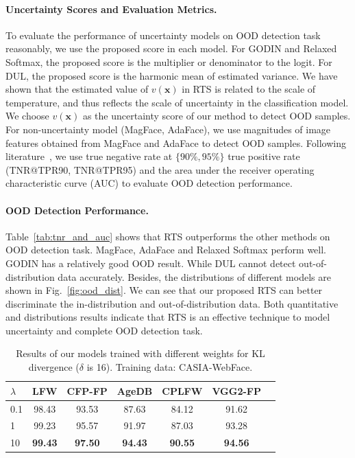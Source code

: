 \documentclass[letterpaper]{article} %
\begin{document}
\paragraph{Uncertainty Scores and Evaluation Metrics.}
To evaluate the performance of uncertainty models on OOD detection task reasonably, we use the proposed score in each model. For GODIN and Relaxed Softmax, the proposed score is the multiplier or denominator to the logit. For DUL, the proposed score is the harmonic mean of estimated variance. We have shown that the estimated value of $v(\bm{x})$ in RTS is related to the scale of temperature, and thus reflects the scale of uncertainty in the classification model. We choose $v(\bm{x})$ as the uncertainty score of our method to detect OOD samples. For non-uncertainty model (MagFace, AdaFace), we use magnitudes of image features obtained from MagFace and AdaFace to detect OOD samples.
%
Following literature~\cite{hsu2020generalized}, we use true negative rate at $\{90\%, 95\%\}$ true positive rate (TNR@TPR90, TNR@TPR95) and the area under the receiver operating characteristic curve (AUC) to evaluate OOD detection performance.

\paragraph{OOD Detection Performance.}
Table~\ref{tab:tnr_and_auc} shows that RTS outperforms the other methods on OOD detection task. MagFace, AdaFace and Relaxed Softmax perform well. GODIN has a relatively good OOD result. While DUL cannot detect out-of-distribution data accurately. Besides, the distributions of different models are shown in Fig.~\ref{fig:ood_dist}. We can see that our proposed RTS can better discriminate the in-distribution and out-of-distribution data. Both quantitative and distributions results indicate that RTS is an effective technique to model uncertainty and complete OOD detection task.












\begin{table}
\centering
\begin{tabular}{|l|c|c|c|c|c|c|}
\hline
$\lambda$ & LFW & CFP-FP & AgeDB & CPLFW & VGG2-FP \\
\hline\hline
0.1 & 98.43 & 93.53 & 87.63 & 84.12 & 91.62 \\
1 & 99.23 & 95.57 & 91.97 & 87.03 & 93.28 \\
10 & \textbf{99.43} & \textbf{97.50} & \textbf{94.43} & \textbf{90.55} & \textbf{94.56} \\
\hline
\end{tabular}
\caption{Results of our models trained with different weights for KL divergence ($\delta$ is 16). Training data: CASIA-WebFace.}
\label{tab:kl_weight}
\end{table}
\end{document}
